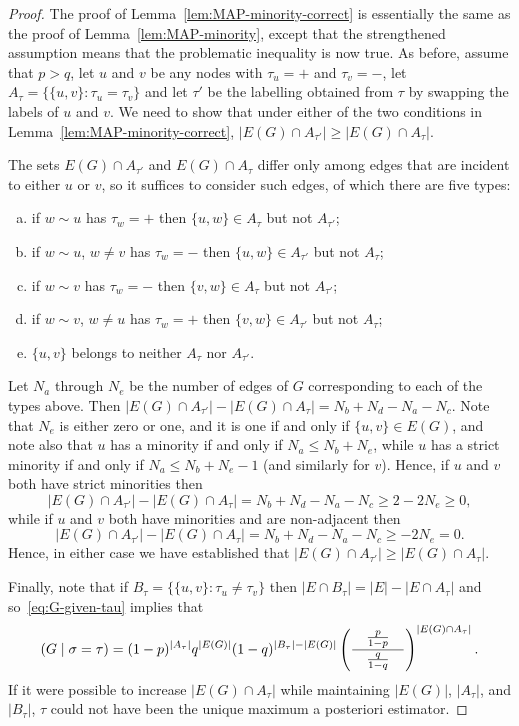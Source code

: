 \documentclass[EJP]{ejpecp}
\newcommand{\1}[1]{\mathbbm{1}_{\{#1\}}}
\let\Pr\relax
\DeclareMathOperator{\Pr}{Pr}
\begin{document}
\begin{proof}
    The proof of Lemma~\ref{lem:MAP-minority-correct} is essentially the same as the proof
    of Lemma~\ref{lem:MAP-minority}, except that the strengthened assumption
    means that the problematic inequality is now true.
    As before, assume that $p > q$, let $u$ and $v$ be any nodes with $\tau_u = +$ and $\tau_v = -$,
    let $A_\tau = \{\{u, v\}: \tau_u = \tau_v\}$
    and let $\tau'$ be the labelling obtained from $\tau$ by swapping the labels of $u$ and $v$.
    We need to show that under either of the two conditions in Lemma~\ref{lem:MAP-minority-correct},
    $|E(G) \cap A_{\tau'}| \ge |E(G) \cap A_\tau|$.

    The sets $E(G) \cap A_{\tau'}$ and $E(G) \cap A_\tau$
    differ only among edges that are incident to either $u$ or $v$, so it suffices to consider such edges, of which there are five types:
    \begin{enumerate}[a)]
        \item if $w \sim u$ has $\tau_w = +$ then $\{u, w\} \in A_\tau$ but not $A_{\tau'}$;
        \item if $w \sim u$, $w \ne v$ has $\tau_w = -$ then $\{u, w\} \in A_{\tau'}$ but not $A_\tau$;
        \item if $w \sim v$ has $\tau_w = -$ then $\{v, w\} \in A_\tau$ but not $A_{\tau'}$;
        \item if $w \sim v$, $w \ne u$ has $\tau_w = +$ then $\{v, w\} \in A_{\tau'}$ but not $A_\tau$;
        \item $\{u, v\}$ belongs to neither $A_\tau$ nor $A_{\tau'}$.
    \end{enumerate}
    Let $N_a$ through $N_e$ be the number of edges of $G$ corresponding to each of the types above.
    Then $|E(G) \cap A_{\tau'}| - |E(G) \cap A_\tau| = N_b + N_d - N_a - N_c$.
    Note that $N_e$ is either zero or one, and it is one if and only if $\{u, v\} \in E(G)$, and 
    note also that $u$ has a minority if and only if $N_a \le N_b + N_e$, while $u$
    has a strict minority if and only if $N_a \le N_b + N_e - 1$ (and similarly for $v$).
    Hence, if $u$ and $v$ both have strict minorities then
    \[
        |E(G) \cap A_{\tau'}| - |E(G) \cap A_\tau| = N_b + N_d - N_a - N_c \ge 2 - 2 N_e \ge 0,
    \]
    while if $u$ and $v$ both have minorities and are non-adjacent then
    \[
        |E(G) \cap A_{\tau'}| - |E(G) \cap A_\tau| = N_b + N_d - N_a - N_c \ge - 2 N_e = 0.
    \]
    Hence, in either case we have established that $|E(G) \cap A_{\tau'}| \ge |E(G) \cap A_\tau|$.

    Finally, note that if $B_\tau = \{\{u,v\}: \tau_u \ne \tau_v\}$ then $|E \cap B_\tau| = |E| - |E \cap A_\tau|$ and so~\eqref{eq:G-given-tau}
    implies that
    \[
        \Pr(G \mid \sigma = \tau) = (1-p)^{|A_\tau|} q^{|E(G)|} (1-q)^{|B_\tau| - |E(G)|} \left(
            \frac{\quad\frac{p}{1-p}\quad}{\frac{q}{1-q}}
        \right)^{|E(G) \cap A_\tau|}.
    \]
    If it were possible to increase $|E(G) \cap A_\tau|$ while maintaining $|E(G)|$, $|A_\tau|$, and $|B_\tau|$, $\tau$
    could not have been the unique maximum a posteriori estimator.
\end{proof}
\end{document}
